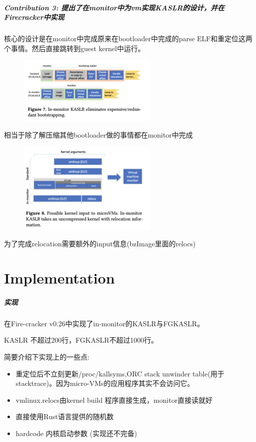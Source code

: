 \documentclass[
    aspectratio=169,  %
]{ctexbeamer}
\begin{document}
\begin{frame}
  \frametitle{Contribution 3: 提出了在monitor中为vm实现KASLR的设计，并在Firecracker中实现}
核心的设计是在monitor中完成原来在bootloader中完成的parse ELF和重定位这两个事情。然后直接跳转到guest kernel中运行。
\end{frame}

\begin{frame}
  \begin{figure}
  	\centering
  	\includegraphics[width=0.6\textwidth]{img/in_monitor.png}
  \end{figure}
  相当于除了解压缩其他bootloader做的事情都在monitor中完成
\end{frame}

\begin{frame}
  \begin{figure}
  	\centering
  	\includegraphics[width=0.6\textwidth]{img/kernel_input.png}
  \end{figure}
  为了完成relocation需要额外的input信息(bzImage里面的relocs)
\end{frame}

\part{Implementation}

\begin{frame}
  \frametitle{实现}

在Fire-cracker v0.26中实现了in-monitor的KASLR与FGKASLR。

KASLR 不超过200行，FGKASLR不超过1000行。

简要介绍下实现上的一些点:

  \begin{itemize}
    \item 重定位后不立刻更新/proc/kallsyms,ORC stack unwinder table(用于stacktrace)。因为micro-VMs的应用程序其实不会访问它。
    \item vmlinux.relocs由kernel build 程序直接生成，monitor直接读就好
    \item 直接使用Rust语言提供的随机数
    \item hardcode 内核启动参数 (实现还不完备)
  \end{itemize}

\end{frame}
\end{document}
